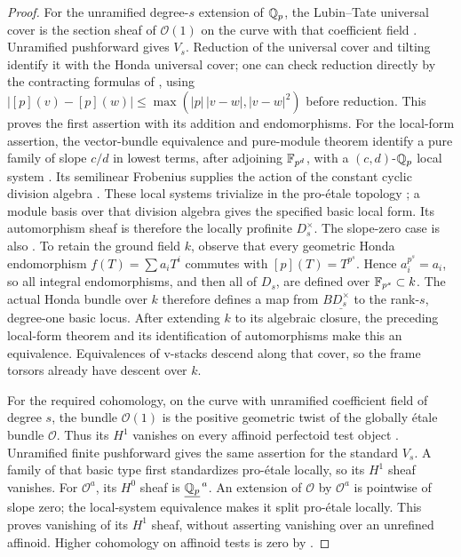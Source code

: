 \begin{proof}
For the unramified degree-$s$ extension of $\mathbb Q_p$, the
Lubin--Tate universal cover is the section sheaf of $\mathcal O(1)$
on the curve with that coefficient field
\cite[Proposition II.2.2]{FarguesScholze}.  Unramified pushforward gives $V_s$.
Reduction of the universal cover and tilting identify it with the
Honda universal cover; one can check reduction directly by the
contracting formulas of , using
$|[p](v)-[p](w)|\leq\max(|p|\,|v-w|,|v-w|^2)$ before reduction.
This proves the first assertion with its addition and endomorphisms.
For the local-form assertion, the vector-bundle equivalence and
pure-module theorem identify a pure family of slope $c/d$ in lowest terms,
after adjoining $\mathbb F_{p^d}$, with a $(c,d)$-$\mathbb Q_p$ local
system \cite[Theorems 8.7.8 and 8.5.12]{KedlayaLiu}.  Its semilinear
Frobenius supplies the action of the constant cyclic division
algebra \cite[Definition 8.5.7]{KedlayaLiu}.  These local systems
trivialize in the pro-\'etale topology
\cite[Lemma 9.1.11]{KedlayaLiu}; a module basis over that division
algebra gives the specified basic local form.  Its automorphism
sheaf is therefore the locally profinite $D_s^\times$.
The slope-zero case is also
\cite[Corollary 8.7.10]{KedlayaLiu}.
To retain the ground field $k$, observe that every geometric
Honda endomorphism $f(T)=\sum a_iT^i$ commutes with
$[p](T)=T^{p^s}$.  Hence $a_i^{p^s}=a_i$, so all integral
endomorphisms, and then all of $D_s$, are defined over
$\mathbb F_{p^s}\subset k$.  The actual Honda bundle over $k$
therefore defines a map from $B\underline{D_s^\times}$ to
the rank-$s$, degree-one basic locus.  After extending $k$
to its algebraic closure, the preceding local-form theorem
and its identification of automorphisms make this an
equivalence.  Equivalences of v-stacks descend along that
cover, so the frame torsors already have descent over $k$.

For the required cohomology, on the curve with unramified
coefficient field of degree $s$, the bundle $\mathcal O(1)$
is the positive geometric twist of the globally \'etale
bundle $\mathcal O$.  Thus its $H^1$ vanishes on every
affinoid perfectoid test object
\cite[Corollary 8.8.7 and Theorem 8.7.13]{KedlayaLiu}.
Unramified finite pushforward gives the same assertion for
the standard $V_s$.  A family of that basic type first
standardizes pro-\'etale locally, so its $H^1$ sheaf vanishes.
For $\mathcal O^a$, its $H^0$ sheaf is
$\underline{\mathbb Q_p}^{\,a}$.  An extension of $\mathcal O$
by $\mathcal O^a$ is pointwise of slope zero; the local-system
equivalence makes it split pro-\'etale locally.  This proves
vanishing of its $H^1$ sheaf, without asserting vanishing
over an unrefined affinoid.  Higher cohomology on affinoid
tests is zero by \cite[Theorem 8.7.13]{KedlayaLiu}.


\end{proof}
